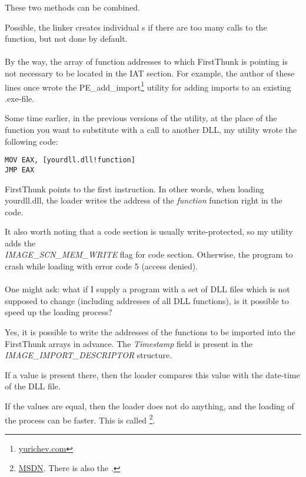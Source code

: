 These two methods can be combined.

Possible, the linker creates individual s if there are too many calls to the function,
but not done by default. \\
\\
By the way, the array of function addresses to which FirstThunk is pointing is not necessary to be located in the \ac{IAT} section.
For example, the author of these lines once wrote the PE\_add\_import\footnote{\href{http://yurichev.com/PE_add_imports.html}{yurichev.com}}
utility for adding imports to an existing .exe-file.

Some time earlier, in the previous versions of the utility,
at the place of the function you want to substitute with a call to another DLL,
my utility wrote the following code:

\begin{lstlisting}[style=customasmx86]
MOV EAX, [yourdll.dll!function]
JMP EAX
\end{lstlisting}

FirstThunk points to the first instruction. In other words, when loading yourdll.dll,
the loader writes the address of the \emph{function} function right in the code.

It also worth noting that a code section is usually write-protected, so my utility adds the \\
\emph{IMAGE\_SCN\_MEM\_WRITE}
flag for code section. Otherwise, the program to crash while loading with error code
5 (access denied). \\
\\
One might ask: what if I supply a program with a set of DLL files which is not supposed to change (including addresses of all DLL functions),
is it possible to speed up the loading process?

Yes, it is possible to write the addresses of the functions to be imported into the FirstThunk arrays in advance.
The \emph{Timestamp} field is present in the \\
\emph{IMAGE\_IMPORT\_DESCRIPTOR} structure.

If a value is present there, then the loader compares this value with the date-time of the DLL file.

If the values are equal, then the loader does not do anything, and the loading of the process can be faster.
This is called 
\footnote{\href{http://blogs.msdn.com/b/oldnewthing/archive/2010/03/18/9980802.aspx}{MSDN}. There is also the .}.

